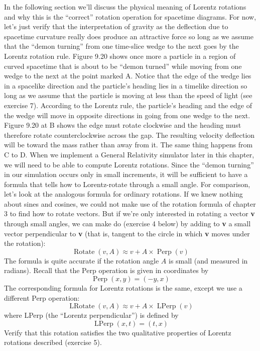 \documentclass{book}
\begin{document}
In the following section we'll discuss the physical meaning of Lorentz
rotations and why this is the ``correct'' rotation operation for spacetime
diagrams. For now, let's just verify that the interpretation of gravity as
the deflection due to spacetime curvature really does produce an attractive force so long as we assume that the ``demon turning'' from one
time-slice wedge to the next goes by the Lorentz rotation rule. Figure
9.20 shows once more a particle in a region of curved spacetime that
is about to be ``demon turned'' while moving from one wedge to the
next at the point marked A. Notice that the edge of the wedge lies in a
spacelike direction and the particle's heading lies in a timelike direction
so long as we assume that the particle is moving at less than the speed
of light (see exercise 7). According to the Lorentz rule, the particle's
heading and the edge of the wedge will move in opposite directions in
going from one wedge to the next. Figure 9.20 at B shows the edge must
rotate clockwise and the heading must therefore rotate counterclockwise
across the gap. The resulting velocity deflection will be toward the mass
rather than away from it. The same thing happens from C to D.
When we implement a General Relativity simulator later in this chapter, we will need to be able to compute Lorentz rotations. Since the
``demon turning'' in our simulation occurs only in small increments, it
will be sufficient to have a formula that tells how to Lorentz-rotate
through a small angle. For comparison, let's look at the analogous formula for ordinary rotations. If we knew nothing about sines and cosines,
we could not make use of the rotation formula of chapter 3 to find how
to rotate vectors. But if we're only interested in rotating a vector \textbf{v}
through small angles, we can make do (exercise 4 below) by adding to \textbf{v}
a small vector perpendicular to \textbf{v} (that is, tangent to the circle in which
\textbf{v} moves under the rotation):
$$\operatorname{Rotate}(v, A) \approx v + A \times \operatorname{Perp}(v)$$
The formula is quite accurate if the rotation angle $A$ is small (and
measured in radians). Recall that the Perp operation is given in coordinates by
$$\operatorname{Perp}(x, y) = (-y, x)$$
The corresponding formula for Lorentz rotations is the same, except we
use a different Perp operation:
$$\operatorname{LRotate}(v, A) \approx v + A \times \operatorname{LPerp}(v)$$
where LPerp (the ``Lorentz perpendicular'') is defined by
$$\operatorname{LPerp}(x, t) = (t, x)$$
Verify that this rotation satisfies the two qualitative properties of Lorentz
rotations described (exercise 5).
\end{document}
